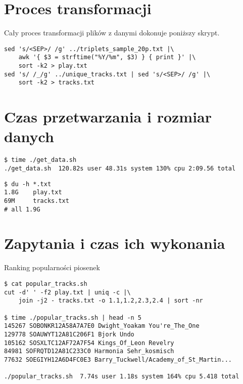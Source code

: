 \documentclass[a4paper,11pt]{article}
\begin{document}
\section{Proces transformacji}

Cały proces transformacji plików z danymi dokonuje poniższy skrypt.

\begin{verbatim}
sed 's/<SEP>/ /g' ../triplets_sample_20p.txt |\
    awk '{ $3 = strftime("%Y/%m", $3) } { print }' |\
    sort -k2 > play.txt
sed 's/ /_/g' ../unique_tracks.txt | sed 's/<SEP>/ /g' |\
    sort -k2 > tracks.txt
\end{verbatim}

\section{Czas przetwarzania i rozmiar danych}

\begin{verbatim}
$ time ./get_data.sh
./get_data.sh  120.82s user 48.31s system 130% cpu 2:09.56 total
\end{verbatim}

\begin{verbatim}
$ du -h *.txt
1.8G    play.txt
69M     tracks.txt
# all 1.9G
\end{verbatim}

\section{Zapytania i czas ich wykonania}

\noindent
Ranking popularności piosenek
\begin{footnotesize}
\begin{verbatim}
$ cat popular_tracks.sh
cut -d' ' -f2 play.txt | uniq -c |\
    join -j2 - tracks.txt -o 1.1,1.2,2.3,2.4 | sort -nr

$ time ./popular_tracks.sh | head -n 5
145267 SOBONKR12A58A7A7E0 Dwight_Yoakam You're_The_One
129778 SOAUWYT12A81C206F1 Bjork Undo
105162 SOSXLTC12AF72A7F54 Kings_Of_Leon Revelry
84981 SOFRQTD12A81C233C0 Harmonia Sehr_kosmisch
77632 SOEGIYH12A6D4FC0E3 Barry_Tuckwell/Academy_of_St_Martin...

./popular_tracks.sh  7.74s user 1.18s system 164% cpu 5.418 total
\end{verbatim}
\end{footnotesize}
\end{document}
